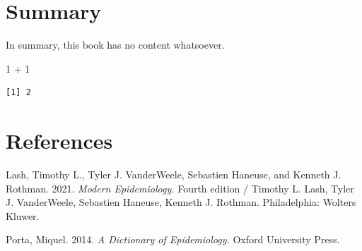 \documentclass[
  letterpaper,
  DIV=11,
  numbers=noendperiod]{scrreprt}
\newenvironment{Shaded}{\begin{snugshade}}{\end{snugshade}}
\newcommand{\DecValTok}[1]{\textcolor[rgb]{0.68,0.00,0.00}{#1}}
\newcommand{\SpecialCharTok}[1]{\textcolor[rgb]{0.37,0.37,0.37}{#1}}
\newlength{\cslhangindent}
\newlength{\cslentryspacingunit} %
\newenvironment{CSLReferences}[2] %
 {%
  \setlength{\parindent}{0pt}
  \ifodd #1
  \let\oldpar\par
  \def\par{\hangindent=\cslhangindent\oldpar}
  \fi
  \setlength{\parskip}{#2\cslentryspacingunit}
 }%
 {}
\begin{document}

\hypertarget{summary}{%
\chapter*{Summary}\label{summary}}


In summary, this book has no content whatsoever.

\begin{Shaded}
\begin{Highlighting}[]
\DecValTok{1} \SpecialCharTok{+} \DecValTok{1}
\end{Highlighting}
\end{Shaded}

\begin{verbatim}
[1] 2
\end{verbatim}


\hypertarget{references}{%
\chapter*{References}\label{references}}


\hypertarget{refs}{}
\begin{CSLReferences}{1}{0}
\leavevmode{}%
Lash, Timothy L., Tyler J. VanderWeele, Sebastien Haneuse, and Kenneth
J. Rothman. 2021. \emph{Modern Epidemiology.} Fourth edition / Timothy
L. Lash, Tyler J. VanderWeele, Sebastien Haneuse, Kenneth J. Rothman.
Philadelphia: Wolters Kluwer.

\leavevmode{}%
Porta, Miquel. 2014. \emph{A Dictionary of Epidemiology.} Oxford
University Press.

\end{CSLReferences}
\end{document}
